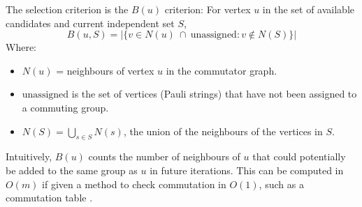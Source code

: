 \documentclass{article}
\begin{document}
The selection criterion is the $B(u)$ criterion: For vertex $u$ in the set of available candidates and current independent set $S$, 
\begin{equation}
    B(u, S) = |\{v \in N(u) ~\cap ~\text{unassigned} : v \not \in N(S)\}|
\end{equation}
Where:
\begin{itemize}
    \item $N(u)$ = neighbours of vertex $u$ in the commutator graph.
    \item $\text{unassigned}$ is the set of vertices (Pauli strings) that have not been assigned to a commuting group.
    \item $N(S) = \bigcup_{s \in S}N(s)$, the union of the neighbours of the vertices in $S$.
\end{itemize}

Intuitively, $B(u)$ counts the number of neighbours of $u$ that could potentially be added to the same group as $u$ in future iterations. This can be computed in $O(m)$ if given a method to check commutation in $O(1)$, such as a commutation table \cite{adegbindin2016}.
\end{document}
